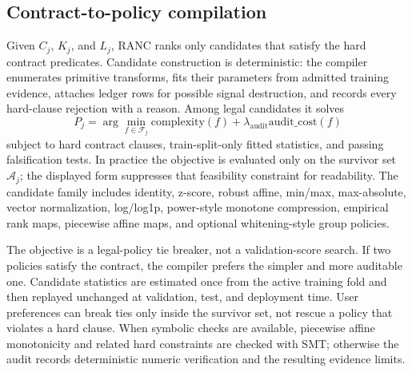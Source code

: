 \documentclass{article}
\begin{document}
\subsection{Contract-to-policy compilation}

Given $C_j$, $K_j$, and $L_j$, RANC ranks only candidates that satisfy the hard
contract predicates. Candidate construction is deterministic: the compiler
enumerates primitive transforms, fits their parameters from admitted training
evidence, attaches ledger rows for possible signal destruction, and records
every hard-clause rejection with a reason. Among legal candidates it solves
\[
P_j = \arg\min_{f \in \mathcal{F}_j}
\mathrm{complexity}(f) + \lambda_{\mathrm{audit}}\mathrm{audit\_cost}(f)
\]
subject to hard contract clauses, train-split-only fitted statistics, and
passing falsification tests. In practice the objective is evaluated only on the
survivor set $\mathcal{A}_j$; the displayed form suppresses that feasibility
constraint for readability. The candidate family includes identity, z-score,
robust affine, min/max, max-absolute, vector normalization, log/log1p,
power-style monotone compression, empirical rank maps, piecewise affine maps,
and optional whitening-style group policies.

The objective is a legal-policy tie breaker, not a validation-score search. If
two policies satisfy the contract, the compiler prefers the simpler and more
auditable one. Candidate statistics are estimated once from the active training
fold and then replayed unchanged at validation, test, and deployment time. User
preferences can break ties only inside the survivor set, not rescue a policy
that violates a hard clause. When symbolic checks are available, piecewise
affine monotonicity and related hard constraints are checked with SMT; otherwise
the audit records deterministic numeric verification and the resulting evidence
limits.
\end{document}
